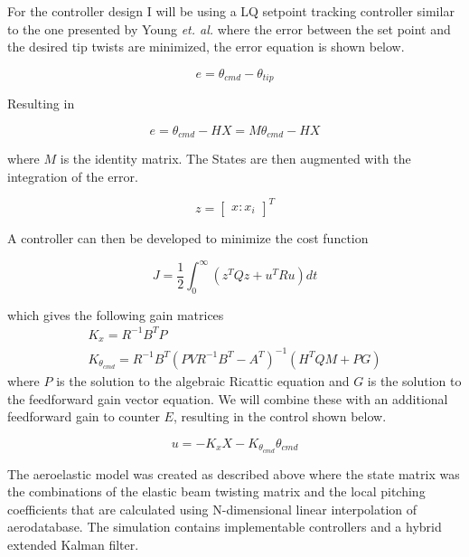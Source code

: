 \documentclass[11pt]{ucthesis}
\begin{document}
For the controller design I will be using a LQ setpoint tracking controller similar to the one presented by Young \textit{et. al.}\cite{young1972approach}  where the error between the set point and the desired tip twists are minimized, the error equation is shown below.

\begin{equation}
e = \theta_{cmd}-\theta_{tip}
\end{equation}

Resulting in

\begin{equation}
e = \theta_{cmd}-HX = M\theta_{cmd}-HX
\end{equation}

where $M$ is the identity matrix. The States are then augmented with the integration of the error.

\begin{equation}
z = \begin{bmatrix}
x:x_i\end{bmatrix}^T
\end{equation}

A controller can then be developed to minimize the cost function

\begin{equation}
J=\frac{1}{2}\int^{\infty}_0 (z^TQz+u^TRu)dt
\end{equation}

which gives the following gain matrices
\begin{equation}
\begin{matrix}
K_x = R^{-1}B^TP\\
K_{\theta_{cmd}} = R^{-1}B^T(PVR^{-1}B^T-A^T)^{-1}(H^TQM+PG)
\end{matrix}
\end{equation}
where $P$ is the solution to the algebraic Ricattic equation and $G$ is the solution to the feedforward gain vector equation. We will combine these with an additional feedforward gain to counter $E$, resulting in the control shown below.

\begin{equation}
u = -K_xX-K_{\theta_{cmd}}\theta_{cmd}
\end{equation}

The aeroelastic model was created as described above where the state matrix was the combinations of the elastic beam twisting matrix and the local pitching coefficients that are calculated using N-dimensional linear interpolation of aerodatabase. The simulation contains implementable controllers and a hybrid extended Kalman filter.
\end{document}
